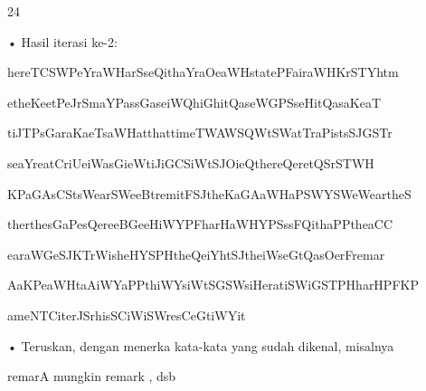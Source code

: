 \documentclass{article}
\begin{document}

24

• Hasil iterasi ke-2:

 hereTCSWPeYraWHarSseQithaYraOeaWHstatePFairaWHKrSTYhtm

etheKeetPeJrSmaYPassGaseiWQhiGhitQaseWGPSseHitQasaKeaT

tiJTPsGaraKaeTsaWHatthattimeTWAWSQWtSWatTraPistsSJGSTr

seaYreatCriUeiWasGieWtiJiGCSiWtSJOieQthereQeretQSrSTWH

KPaGAsCStsWearSWeeBtremitFSJtheKaGAaWHaPSWYSWeWeartheS

therthesGaPesQereeBGeeHiWYPFharHaWHYPSssFQithaPPtheaCC

earaWGeSJKTrWisheHYSPHtheQeiYhtSJtheiWseGtQasOerFremar

AaKPeaWHtaAiWYaPPthiWYsiWtSGSWsiHeratiSWiGSTPHharHPFKP

ameNTCiterJSrhisSCiWiSWresCeGtiWYit

• Teruskan, dengan menerka kata-kata yang sudah dikenal, misalnya 

remarA mungkin remark , dsb
\end{document}
